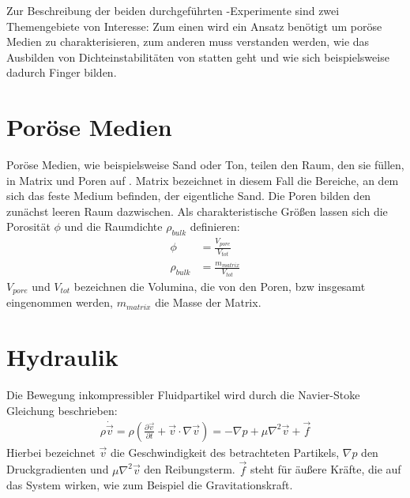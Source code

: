 \label{cha:theo}

Zur Beschreibung der beiden durchgeführten \HSCs-Experimente sind zwei Themengebiete von Interesse: Zum einen wird ein Ansatz benötigt um poröse Medien zu
charakterisieren, zum anderen muss verstanden werden, wie das Ausbilden von Dichteinstabilitäten von statten geht und wie sich beispielsweise dadurch Finger
bilden.


\section{Poröse Medien}
\label{sec:por}

Poröse Medien, wie beispielsweise Sand oder Ton, teilen den Raum, den sie füllen, in Matrix und Poren auf \citep{roth2005}.  Matrix bezeichnet in diesem Fall die Bereiche, an dem sich das feste Medium befinden, der eigentliche Sand. Die Poren bilden den zunächst leeren Raum dazwischen.
Als charakteristische Größen lassen sich die Porosität $\phi$ und die Raumdichte $\rho_{bulk}$ definieren:
\begin{align}
 \phi &= \frac{V_{pore}}{V_{tot}} \\
 \rho_{bulk} &= \frac{m_{matrix}}{V_{tot}} %
\end{align}
$V_{pore}$ und $V_{tot}$ bezeichnen die Volumina, die von den Poren, bzw insgesamt eingenommen werden, $m_{matrix}$ die Masse der Matrix. 


\section{Hydraulik}
\label{sec:hyd}
Die Bewegung inkompressibler Fluidpartikel wird durch die Navier-Stoke Gleichung beschrieben:
\begin{eqnarray}
 \rho \dot{\vec{v}} = \rho \left( \frac{\partial \vec{v}}{\partial t} + \vec{v} \cdot \nabla \vec{v} \right) = - \nabla p + \mu \nabla^2 \vec{v} + \vec{f}
\end{eqnarray}
Hierbei bezeichnet $\vec{v}$ die Geschwindigkeit des betrachteten Partikels, $\nabla p$ den Druckgradienten und $\mu \nabla^2 \vec{v}$ den Reibungsterm. $\vec{f}$ steht für äußere Kräfte, die auf das System wirken, wie zum Beispiel die Gravitationskraft. \citep{roth2005}

